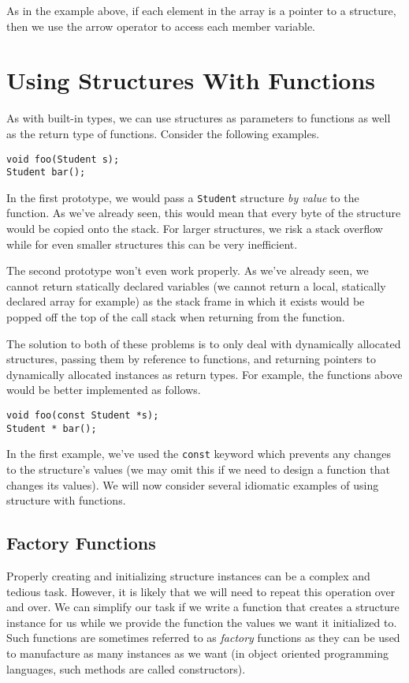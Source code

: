 As in the example above, if each element in the array is a pointer
to a structure, then we use the arrow operator to access each 
member variable.

\section{Using Structures With Functions}

As with built-in types, we can use structures as parameters to functions
as well as the return type of functions.  Consider the following
examples.

\begin{verbatim}
void foo(Student s);
Student bar();
\end{verbatim}

In the first prototype, we would pass a \texttt{Student} structure
\emph{by value} to the function.  As we've already seen, this would
mean that every byte of the structure would be copied onto the stack.
For larger structures, we risk a stack overflow while for even smaller
structures this can be very inefficient.  

The second prototype won't even work properly.  As we've already seen, 
we cannot return statically declared variables (we cannot return a local,
statically declared array for example) as the stack frame in which it
exists would be popped off the top of the call stack when returning
from the function.

The solution to both of these problems is to only deal with dynamically
allocated structures, passing them by reference to functions, and
returning pointers to dynamically allocated instances as return types.
For example, the functions above would be better implemented as follows.

\begin{verbatim}
void foo(const Student *s);
Student * bar();
\end{verbatim}

In the first example, we've used the \texttt{const} keyword which
prevents any changes to the structure's values (we may omit this if
we need to design a function that changes its values).  We will now
consider several idiomatic examples of using structure with functions.

\subsection{Factory Functions}

Properly creating and initializing structure instances can be a
complex and tedious task.  However, it is likely that we will need
to repeat this operation over and over.  We can simplify our task
if we write a function that creates a structure instance for us while
we provide the function the values we want it initialized to.  
Such functions are sometimes referred to as \emph{factory} functions
as they can be used to manufacture as many instances as we want
(in object oriented programming languages, such methods are called
constructors).

